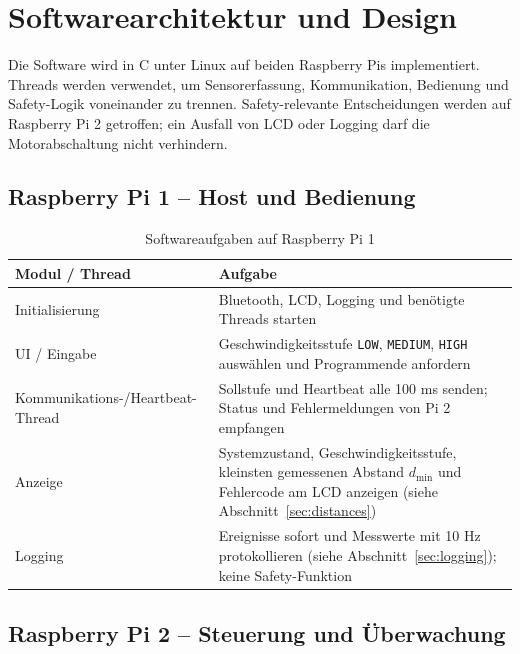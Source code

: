 \clearpage
\section{Softwarearchitektur und Design}
\label{sec:software}

Die Software wird in C unter Linux auf beiden Raspberry Pis implementiert.
Threads werden verwendet, um Sensorerfassung, Kommunikation, Bedienung und
Safety-Logik voneinander zu trennen. Safety-relevante Entscheidungen werden auf
Raspberry Pi 2 getroffen; ein Ausfall von LCD oder Logging darf die
Motorabschaltung nicht verhindern.

\subsection{Raspberry Pi 1 -- Host und Bedienung}

\begin{table}[H]
    \centering
    \small
    \begin{tabularx}{\textwidth}{@{}p{4.2cm}Y@{}}
        \toprule
        \textbf{Modul / Thread} & \textbf{Aufgabe} \\
        \midrule
        Initialisierung & Bluetooth, LCD, Logging und benötigte Threads starten \\
        UI / Eingabe & Geschwindigkeitsstufe \texttt{LOW}, \texttt{MEDIUM}, \texttt{HIGH} auswählen und Programmende anfordern \\
        Kommunikations-/Heartbeat-Thread & Sollstufe und Heartbeat alle 100 ms senden; Status und Fehlermeldungen von Pi 2 empfangen \\
        Anzeige & Systemzustand, Geschwindigkeitsstufe, kleinsten gemessenen Abstand $d_{\min}$ und Fehlercode am LCD anzeigen (siehe Abschnitt~\ref{sec:distances}) \\
        Logging & Ereignisse sofort und Messwerte mit 10 Hz protokollieren (siehe Abschnitt~\ref{sec:logging}); keine Safety-Funktion \\
        \bottomrule
    \end{tabularx}
    \caption{Softwareaufgaben auf Raspberry Pi 1}
\end{table}

\subsection{Raspberry Pi 2 -- Steuerung und Überwachung}

